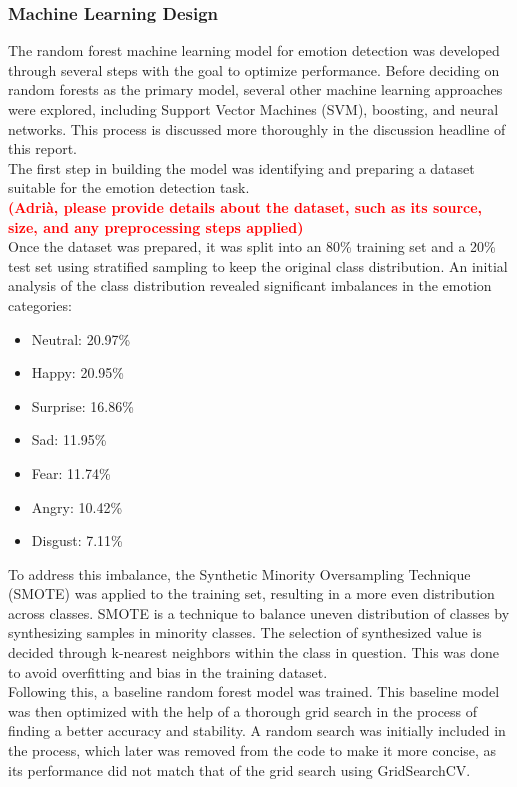 \documentclass[conference]{IEEEtran}
\begin{document}
\subsubsection{Machine Learning Design}
The random forest machine learning model for emotion detection was developed through several steps with the goal to optimize performance. Before deciding on random forests as the primary model, several other machine learning approaches were explored, including Support Vector Machines (SVM), boosting, and neural networks. This process is discussed more thoroughly in the discussion headline of this report.\\ The first step in building the model was identifying and preparing a dataset suitable for the emotion detection task. \\ \textcolor{red}{\textbf{(Adrià, please provide details about the dataset, such as its source, size, and any preprocessing steps applied)}}\\
Once the dataset was prepared, it was split into an 80\% training set and a 20\% test set using stratified sampling to keep the original class distribution. An initial analysis of the class distribution revealed significant imbalances in the emotion categories:
\begin{itemize}
    \item Neutral: 20.97\%
	\item Happy: 20.95\%
	\item Surprise: 16.86\%
	\item Sad: 11.95\%
	\item Fear: 11.74\%
	\item Angry: 10.42\%
	\item Disgust: 7.11\%
\end{itemize}	
To address this imbalance, the Synthetic Minority Oversampling Technique (SMOTE) was applied to the training set, resulting in a more even distribution across classes. SMOTE is a technique to balance uneven distribution of classes by synthesizing samples in minority classes. The selection of synthesized value is decided through k-nearest neighbors within the class in question. This was done to avoid overfitting and bias in the training dataset.  
\\Following this, a baseline random forest model was trained.
This baseline model was then optimized with the help of a thorough grid search in the process of finding a better accuracy and stability. A random search was initially included in the process, which later was removed from the code to make it more concise, as its performance did not match that of the grid search using GridSearchCV.
\end{document}
